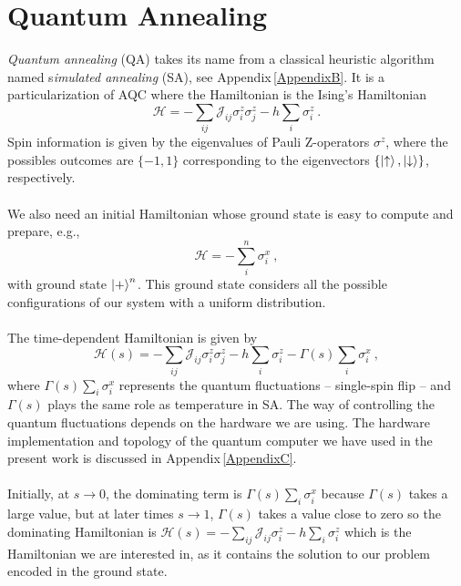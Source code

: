 \section{Quantum Annealing}
\textit{Quantum annealing} (QA) takes its name from a classical heuristic algorithm named s\textit{imulated annealing} (SA), see Appendix\,\ref{AppendixB}. It is a particularization of AQC where the Hamiltonian is the Ising's Hamiltonian
\begin{equation}
    \mathcal{H} = -\sum_{ij}\mathcal{J}_{ij}\sigma_{i}^{z}\sigma_{j}^{z} - h\sum_{i}\sigma_{i}^{z}\ .
\end{equation}
Spin information is given by the eigenvalues of Pauli Z-operators $\sigma^{z}$, where the possibles outcomes are $\{-1,1\}$ corresponding to the eigenvectors $\{\ket{\uparrow},\ket{\downarrow}\}$, respectively.\\\\
We also need an initial Hamiltonian whose ground state is easy to compute and prepare, e.g.,
\begin{equation}
    \mathcal{H} = -\sum_{i}^{n}\sigma_{i}^{x}\ ,
\end{equation}
with ground state $\ket{+}^{n}$. This ground state considers all the possible configurations of our system with a uniform distribution.\\\\
The time-dependent Hamiltonian is given by
\begin{equation}
    \mathcal{H}(s) = -\sum_{ij}\mathcal{J}_{ij}\sigma_{i}^{z}\sigma_{j}^{z} - h\sum_{i}\sigma_{i}^{z} - \Gamma(s)\sum_{i}\sigma_{i}^{x}\ ,
\end{equation}
where $\Gamma(s)\sum_{i}\sigma_{i}^{x}$ represents the quantum fluctuations -- single-spin flip -- and $\Gamma(s)$ plays the same role as temperature in SA. The way of controlling the quantum fluctuations depends on the hardware we are using. The hardware implementation and topology of the quantum computer we have used in the present work is discussed in Appendix\,\ref{AppendixC}.\\\\
Initially, at $s \rightarrow 0$, the dominating term is $\Gamma(s)\sum_{i}\sigma_{i}^{x}$ because $\Gamma(s)$ takes a large value, but at later times $s \rightarrow 1$, $\Gamma(s)$ takes a value close to zero so the dominating Hamiltonian is $\mathcal{H}(s) = -\sum_{ij}\mathcal{J}_{ij}\sigma_{i}^{z} - h\sum_{i}\sigma_{i}^{z}$ which is the Hamiltonian we are interested in, as it contains the solution to our problem encoded in the ground state.
